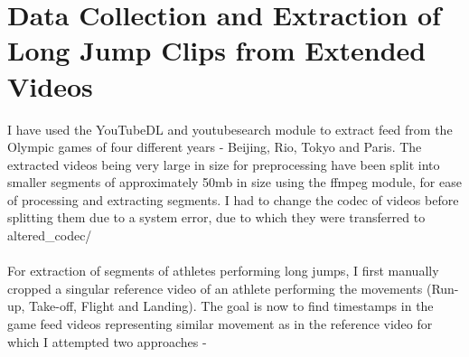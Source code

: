 \documentclass[12pt, letterpaper]{article}
\begin{document}
 \section{Data Collection and Extraction of Long Jump Clips from Extended Videos}
I have used the YouTubeDL and youtubesearch module to extract feed from
the Olympic games of four different years - Beijing, Rio, Tokyo and Paris.
The extracted videos being very large in size for preprocessing have been split
into smaller segments of approximately 50mb in size using the ffmpeg module,
 for ease of processing and extracting segments. I had to change the codec of videos before splitting them due to a system error, due to which they were transferred to altered_codec/
 \\\\For extraction of segments of athletes performing long jumps, 
 I first manually cropped a singular reference video of an athlete performing 
 the movements (Run-up, Take-off, Flight and Landing). The goal is now to find timestamps
 in the game feed videos representing similar movement as in the reference video for which I attempted two approaches - 
\end{document}
